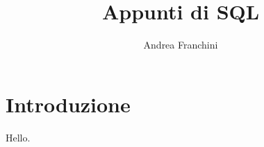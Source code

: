 \documentclass[10pt,a4paper]{article}
\author{Andrea Franchini}
\title{Appunti di SQL}
\begin{document}
    
\maketitle

\section{Introduzione}

Hello.
\end{document}
